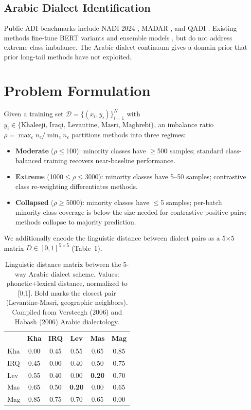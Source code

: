 \documentclass[11pt,a4paper,twocolumn]{article}
\begin{document}
\subsection{Arabic Dialect Identification}
Public ADI benchmarks include NADI 2024 \citep{Al-Badrashiny2024},
MADAR \citep{Bouamor2019}, and QADI \citep{Abdelrahman-Rezk2020QADI}.
Existing methods fine-tune BERT variants
\citep{Antoun2020,Abdul-Mageed2021} and ensemble models
\citep{Abdelaty2023}, but do not address extreme class imbalance.
The Arabic dialect continuum \citep{Versteegh2006,Habash2006} gives
a domain prior that prior long-tail methods have not exploited.

\section{Problem Formulation}
Given a training set $\mathcal{D}=\{(x_i,y_i)\}_{i=1}^N$ with
$y_i\in\{\text{Khaleeji, Iraqi, Levantine, Masri, Maghrebi}\}$, an
imbalance ratio
$\rho = \max_c n_c / \min_c n_c$ partitions methods into three
regimes:
\begin{itemize}\itemsep0pt
\item \textbf{Moderate} ($\rho\le$100): minority classes have $\ge$500
samples; standard class-balanced training recovers near-baseline
performance.
\item \textbf{Extreme} (1000$\le\rho\le$3000): minority classes have
5--50 samples; contrastive class re-weighting differentiates methods.
\item \textbf{Collapsed} ($\rho\ge$5000): minority classes have $\le$5
samples; per-batch minority-class coverage is below the size needed
for contrastive positive pairs; methods collapse to majority
prediction.
\end{itemize}

We additionally encode the linguistic distance between dialect pairs
as a 5$\times$5 matrix $D \in [0,1]^{5\times 5}$ (Table~\ref{tab:dist}).

\begin{table}[t]
\centering
\small
\begin{tabular}{lccccc}
\toprule
& Kha & IRQ & Lev & Mas & Mag \\
\midrule
Kha & 0.00 & 0.45 & 0.55 & 0.65 & 0.85 \\
IRQ & 0.45 & 0.00 & 0.40 & 0.50 & 0.75 \\
Lev & 0.55 & 0.40 & 0.00 & \textbf{0.20} & 0.70 \\
Mas & 0.65 & 0.50 & \textbf{0.20} & 0.00 & 0.65 \\
Mag & 0.85 & 0.75 & 0.70 & 0.65 & 0.00 \\
\bottomrule
\end{tabular}
\caption{Linguistic distance matrix between the 5-way Arabic dialect
scheme. Values: phonetic+lexical distance, normalized to [0,1]. Bold
marks the closest pair (Levantine-Masri, geographic neighbors).
Compiled from Versteegh (2006) and Habash (2006) Arabic
dialectology.}
\label{tab:dist}
\end{table}
\end{document}
